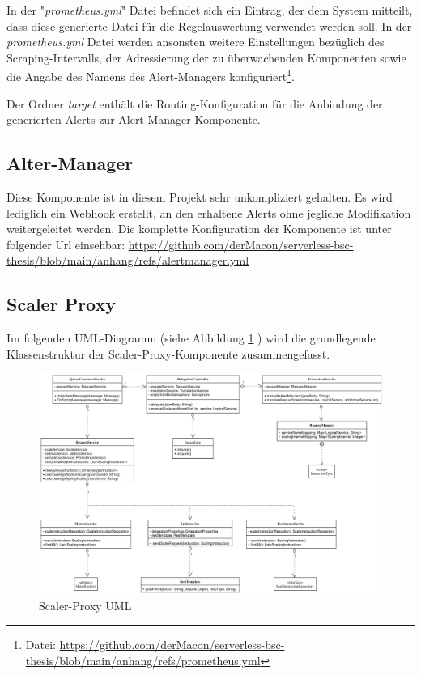 In der "\emph{prometheus.yml}" Datei befindet sich ein Eintrag, der dem System mitteilt, dass diese generierte Datei für die Regelauswertung verwendet werden soll. In der \emph{prometheus.yml} Datei werden ansonsten weitere Einstellungen bezüglich des Scraping-Intervalls, der Adressierung der zu überwachenden Komponenten sowie die Angabe des Namens des Alert-Managers konfiguriert\footnote{Datei: \url{https://github.com/derMacon/serverless-bsc-thesis/blob/main/anhang/refs/prometheus.yml}}.

Der Ordner \emph{target} enthält die Routing-Konfiguration für die Anbindung der generierten Alerts zur Alert-Manager-Komponente.
\subsection{Alter-Manager}
Diese Komponente ist in diesem Projekt sehr unkompliziert gehalten. Es wird lediglich ein Webhook erstellt, an den erhaltene Alerts ohne jegliche Modifikation weitergeleitet werden. Die komplette Konfiguration der Komponente ist unter folgender Url einsehbar: \url{https://github.com/derMacon/serverless-bsc-thesis/blob/main/anhang/refs/alertmanager.yml}


\subsection{Scaler Proxy}

Im folgenden UML-Diagramm (siehe Abbildung \ref{fig:proxyScalerUml} ) wird die grundlegende Klassenstruktur der Scaler-Proxy-Komponente zusammengefasst. 

\begin{figure}[ht!]
	\centering
	\includegraphics[width=\linewidth]{kapitel/problemloesung/implementierung/_img/scaler-proxy-uml}
	\caption[Scaler-Proxy UML]{Scaler-Proxy UML}
	\label{fig:proxyScalerUml}
\end{figure}

